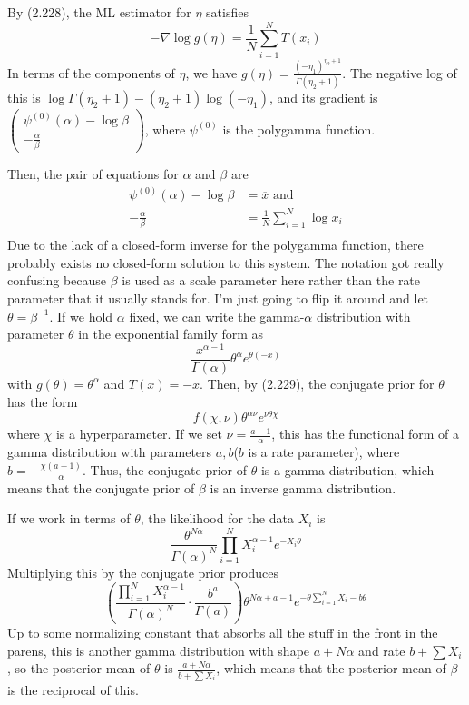 \documentclass{article}
\newcommand{\conj}{\overline}
\newcommand{\openm}{\begin{pmatrix}}
\newcommand{\closem}{\end{pmatrix}}
\begin{document}
By (2.228), the ML estimator for $\eta$ satisfies
\[-\nabla \log g(\eta)=\frac{1}{N}\sum_{i=1}^NT(x_i)\]
In terms of the components of $\eta$, we have $g(\eta)=\frac{(-\eta_1)^{\eta_2+1}}{\Gamma(\eta_2+1)}$. The negative log of this is $\log\Gamma(\eta_2+1)-(\eta_2+1)\log(-\eta_1)$, and its gradient is $\openm\psi^{(0)}(\alpha)-\log\beta\\-\frac{\alpha}{\beta}\closem$, where $\psi^{(0)}$ is the polygamma function.

Then, the pair of equations for $\alpha$ and $\beta$ are 
\begin{align*}
    \psi^{(0)}(\alpha)-\log\beta&=\conj{x}\text{ and}\\
    -\frac{\alpha}{\beta}&=\frac{1}{N}\sum_{i=1}^N\log x_i\\
\end{align*}
Due to the lack of a closed-form inverse for the polygamma function, there probably exists no closed-form solution to this system.
The notation got really confusing because $\beta$ is used as a scale parameter here rather than the rate parameter that it usually stands for. I'm just going to flip it around and let $\theta=\beta^{-1}$. If we hold $\alpha$ fixed, we can write the gamma-$\alpha$ distribution with parameter $\theta$ in the exponential family form as
\[\frac{x^{\alpha-1}}{\Gamma(\alpha)}\theta^\alpha e^{\theta(-x)}\]
with $g(\theta)=\theta^\alpha$ and $T(x)=-x$. Then, by (2.229), the conjugate prior for $\theta$ has the form
\[f(\chi, \nu)\theta^{\alpha\nu}e^{\nu\theta\chi}\]
where $\chi$ is a hyperparameter. If we set $\nu=\frac{a-1}{\alpha}$, this has the functional form of a gamma distribution with parameters $a,b$($b$ is a rate parameter), where $b=-\frac{\chi(a-1)}{\alpha}$. Thus, the conjugate prior of $\theta$ is a gamma distribution, which means that the conjugate prior of $\beta$ is an inverse gamma distribution.

If we work in terms of $\theta$, the likelihood for the data $X_i$ is 
\[\frac{\theta^{N\alpha}}{\Gamma(\alpha)^N}\prod_{i=1}^NX_i^{\alpha-1}e^{-X_i\theta}\]
Multiplying this by the conjugate prior produces
\[\left(\frac{\prod_{i=1}^NX_i^{\alpha-1}}{\Gamma(\alpha)^N}\cdot\frac{b^a}{\Gamma(a)}\right)\theta^{N\alpha+a-1}e^{-\theta\sum_{i=1}^NX_i-b\theta}\]
Up to some normalizing constant that absorbs all the stuff in the front in the parens, this is another gamma distribution with shape $a+N\alpha$ and rate $b+\sum X_i$, so the posterior mean of $\theta$ is $\frac{a+N\alpha}{b+\sum X_i}$, which means that the posterior mean of $\beta$ is the reciprocal of this.
\end{document}
